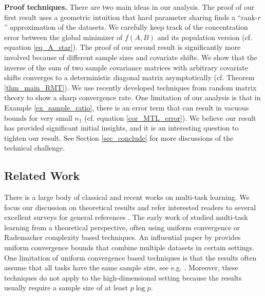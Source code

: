 \medskip
\noindent\textbf{Proof techniques.}
There are two main ideas in our analysis. The proof of our first result uses a geometric intuition that hard parameter sharing finds a ``rank-$r$'' approximation of the datasets.
We carefully keep track of the concentration error between the global minimizer of $f(A, B)$ and its population version (cf. equation \eqref{eq_A_star}).
The proof of our second result is significantly more involved because of different sample sizes and covariate shifts. We show that the inverse of the sum of two sample covariance matrices with arbitrary covariate shifts converges to a deterministic diagonal matrix asymptotically (cf. Theorem \ref{thm_main_RMT}).
We use recently developed techniques from random matrix theory to show a sharp convergence rate.
One limitation of our analysis is that in Example \ref{ex_sample_ratio}, there is an error term that can result in vacuous bounds for very small $n_1$ (cf. equation \eqref{cor_MTL_error}).
We believe our result has provided significant initial insights, and it is an interesting question to tighten our result.
See Section \ref{sec_conclude} for more discussions of the technical challenge.



\subsection{Related Work}

There is a large body of classical and recent works on multi-task learning.
We focus our discussion on theoretical results and refer interested readers to several excellent surveys for general references \cite{PY09,ZY17,V20}.
The early work of \citet{B00,BS03,M06} studied multi-task learning from a theoretical perspective, often using uniform convergence or Rademacher complexity based techniques.
An influential paper by \citet{BBCK10} provides uniform convergence bounds that combine multiple datasets in certain settings.
One limitation of uniform convergence based techniques is that the results often assume that all  tasks have the same sample size, see e.g. \citet{B00,MPR16}.
Moreover, these techniques do not apply to the high-dimensional setting because the results usually require a sample size of at least $p \log p$.

